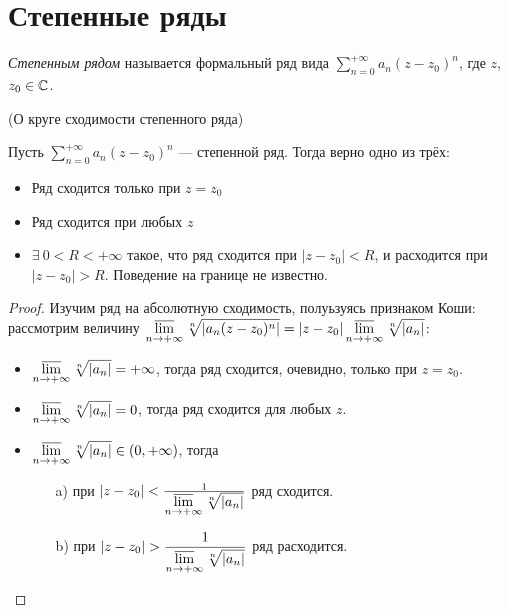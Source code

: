 \section{Степенные ряды}

\begin{definition}
    \textit{Степенным рядом} называется формальный ряд вида $\displaystyle
    \sum_{n = 0}^{+\infty}{a_n (z - z_0)^n}$, где $z$, $z_0 \in \mathbb{C}$.
\end{definition}

\begin{theorem}(О круге сходимости степенного ряда)

    Пусть $\displaystyle \sum_{n = 0}^{+\infty}{a_n (z - z_0)^n}$ ---
    степенной ряд. Тогда верно одно из трёх:
    \begin{itemize}
        \item Ряд сходится только при $z = z_0$
        \item Ряд сходится при любых $z$
        \item $\exists~ 0 < R < +\infty$ такое, что ряд сходится при $|z -
        z_0| < R$, и расходится при $|z - z_0| > R$. Поведение на границе не
        известно.
    \end{itemize}
\end{theorem}
\begin{proof}
    Изучим ряд на абсолютную сходимость, полуьзуясь признаком Коши: рассмотрим
    величину $\displaystyle \varlimsup_{n \to +\infty}{\sqrt[n]{|a_n (z -
    z_0)^n|}} = |z - z_0| \varlimsup_{n \to +\infty}{\sqrt[n]{|a_n|}}$:
    \begin{itemize}
        \item $\displaystyle \varlimsup_{n \to +\infty}{\sqrt[n]{|a_n|}} =
        +\infty$,
        тогда ряд сходится, очевидно, только при $z = z_0$.
        \item $\displaystyle \varlimsup_{n \to +\infty}{\sqrt[n]{|a_n|}} = 0$,
        тогда ряд сходится для любых $z$.
        \item $\displaystyle \varlimsup_{n \to +\infty}{\sqrt[n]{|a_n|}} \in (0,
        +\infty)$, тогда
        \begin{itemize}
            \item[a)] при $|z - z_0| < \frac{1}{\displaystyle \varlimsup_{n \to
            +\infty}{\sqrt[n]{|a_n|}}}$ ряд сходится.
            \item[b)] при $\displaystyle|z - z_0| > \frac{1}{\displaystyle
            \varlimsup_{n \to +\infty}{\sqrt[n]{|a_n|}}}$ ряд расходится.
        \end{itemize}
    \end{itemize}
\end{proof}

